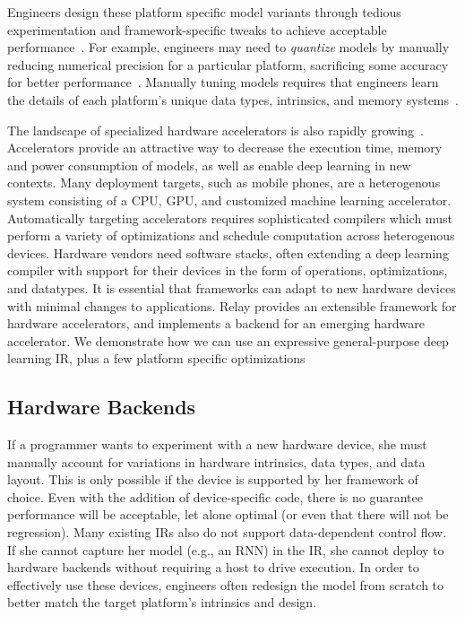 Engineers design these platform specific model variants
  through tedious experimentation and framework-specific tweaks
  to achieve acceptable performance~\citep{mobilenet}. %
For example,
  engineers may need to \textit{quantize} models
  by manually reducing numerical precision for a particular platform,
  sacrificing some accuracy for better performance~\citep{xnornet}.
Manually tuning models requires
  that engineers learn the details of
  each platform's
  unique data types, intrinsics, and memory systems~\citep{fb_fp_hw, tpuv1, brainwave, nn_on_si}.

The landscape of specialized hardware
  accelerators is also rapidly growing~\citep{
    moreau2018vta, OpenTPU, tpuv1}.
Accelerators provide an attractive way to decrease
  the execution time, memory and power consumption of models, as well
  as enable deep learning in new contexts.
Many deployment targets, such as mobile phones, are a heterogenous system
  consisting of a CPU, GPU, and customized machine learning accelerator.
Automatically targeting accelerators requires sophisticated compilers which
  must perform a variety of optimizations and schedule computation across
  heterogenous devices.
Hardware vendors need software stacks, often extending a deep learning
  compiler with support for their devices in the form of operations,
  optimizations, and datatypes.
It is essential that frameworks can adapt to new hardware devices
  with minimal changes to applications.
Relay provides an extensible framework for hardware accelerators,
  and implements a backend for \vta an emerging hardware accelerator\citep{moreau2018vta}.
We demonstrate how we can use an expressive general-purpose deep learning IR, plus
  a few platform specific optimizations

  \subsection{Hardware Backends}

If a programmer wants to experiment with a new hardware device,
  she must manually account for variations in hardware intrinsics, data
  types, and data layout.
This is only possible if the device is supported by her framework of choice.
Even with the addition of device-specific code,
  there is no guarantee performance will be acceptable, let alone optimal
  (or even that there will not be regression).
Many existing IRs also do not support data-dependent control flow.
If she cannot capture her model (e.g., an RNN) in the IR,
  she cannot deploy to hardware backends without requiring a host to drive
  execution.
In order to effectively use these devices,
  engineers often redesign the model from scratch to better match the target
  platform's intrinsics and design.

